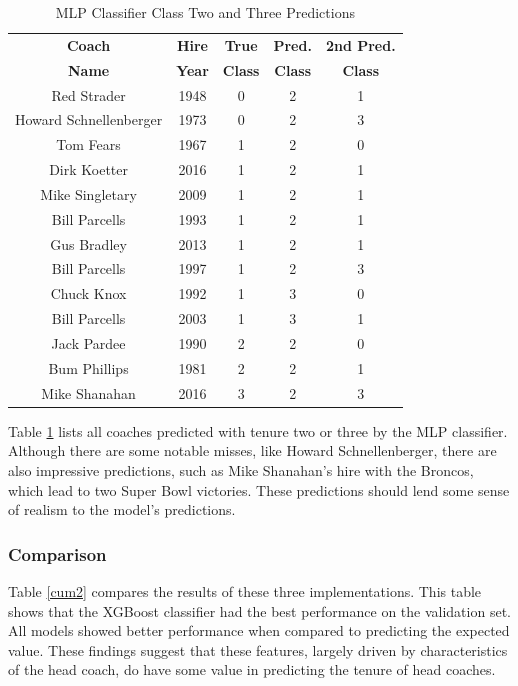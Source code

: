 \documentclass[conference]{IEEEtran}
\begin{document}
\begin{table}[htbp]
\caption{MLP Classifier Class Two and Three Predictions}
\begin{center}
\begin{tabular}{|c||c|c|c|c|}
\hline
\textbf{Coach} & \textbf{Hire} & \textbf{True} & \textbf{Pred.} & \textbf{2nd Pred.} \\
\textbf{Name} & \textbf{Year} & \textbf{Class} & \textbf{Class} & \textbf{Class} \\
\hline
\hline
Red Strader & 1948 & 0 & 2 & 1 \\
\hline
Howard Schnellenberger & 1973 & 0 & 2 & 3 \\
\hline
Tom Fears & 1967 & 1 & 2 & 0 \\
\hline
Dirk Koetter & 2016 & 1 & 2 & 1 \\
\hline
Mike Singletary & 2009 & 1 & 2 & 1 \\
\hline
Bill Parcells & 1993 & 1 & 2 & 1 \\
\hline
Gus Bradley & 2013 & 1 & 2 & 1 \\
\hline
Bill Parcells & 1997 & 1 & 2 & 3 \\
\hline
Chuck Knox & 1992 & 1 & 3 & 0 \\
\hline
Bill Parcells & 2003 & 1 & 3 & 1 \\
\hline
Jack Pardee & 1990 & 2 & 2 & 0 \\
\hline
Bum Phillips & 1981 & 2 & 2 & 1 \\
\hline
Mike Shanahan & 2016 & 3 & 2 & 3 \\
\hline
\end{tabular}
\label{tab15}
\end{center}
\end{table}

Table \ref{tab15} lists all coaches predicted with tenure two or three by the MLP classifier. Although there are some notable misses, like Howard Schnellenberger, there are also impressive predictions, such as Mike Shanahan's hire with the Broncos, which lead to two Super Bowl victories. These predictions should lend some sense of realism to the model's predictions. 

\subsubsection{Comparison}
Table \ref{cum2} compares the results of these three implementations. This table shows that the XGBoost classifier had the best performance on the validation set. All models showed better performance when compared to predicting the expected value. These findings suggest that these features, largely driven by characteristics of the head coach, do have some value in predicting the tenure of head coaches. 
\end{document}
